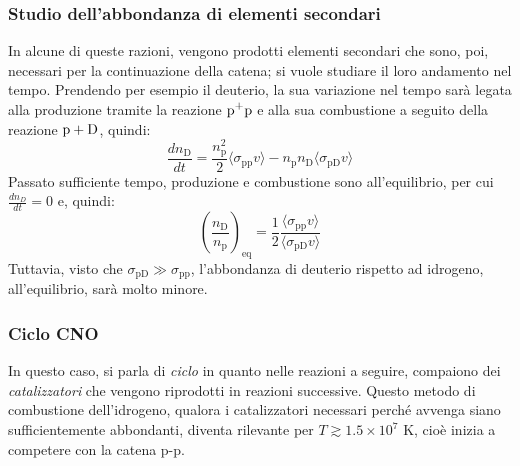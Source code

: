 \documentclass[11pt, a4paper]{scrartcl}
\theoremstyle{style}
\theoremstyle{style1}
\numberwithin{equation}{subsection}
\begin{document}
\subsubsection{Studio dell'abbondanza di elementi secondari}
In alcune di queste razioni, vengono prodotti elementi secondari che sono, poi, necessari per la continuazione della catena; si vuole studiare il loro andamento nel tempo. 
Prendendo per esempio il deuterio, la sua variazione nel tempo sar\`a legata alla produzione tramite la reazione $\ce{p+p}$ e alla sua combustione a seguito della reazione $\ce{p + D}$, quindi:
\[
\frac{d n_\mathrm{D} }{d t} = \frac{n_\mathrm{p} ^2}{2} \langle \sigma _{\mathrm{pp} }  v \rangle - n_\mathrm{p}  n_\mathrm{D}  \langle \sigma _{\mathrm{pD} }  v \rangle
\] 
Passato sufficiente tempo, produzione e combustione sono all'equilibrio, per cui $\frac{d n_D}{d  t} = 0 $ e, quindi:
\[
	\left(\frac{n_\mathrm{D} }{n_\mathrm{p} }\right) _\text{eq} = \frac{1}{2} \frac{\langle \sigma _{\mathrm{pp} } v \rangle}{\langle \sigma _{\mathrm{pD} } v \rangle}
\] 
Tuttavia, visto che $\sigma _{\mathrm{pD} }  \gg \sigma _{\mathrm{pp} } $, l'abbondanza di deuterio rispetto ad idrogeno, all'equilibrio, sar\`a molto minore.


\subsubsection{Ciclo CNO}
In questo caso, si parla di \textit{ciclo} in quanto nelle reazioni a seguire, compaiono dei \textit{catalizzatori} che vengono riprodotti in reazioni successive.
Questo metodo di combustione dell'idrogeno, qualora i catalizzatori necessari perch\'e avvenga siano sufficientemente abbondanti, diventa rilevante per $T \gtrsim 1.5 \times 10^7$ K, cio\`e inizia a competere con la catena p-p.
\end{document}
